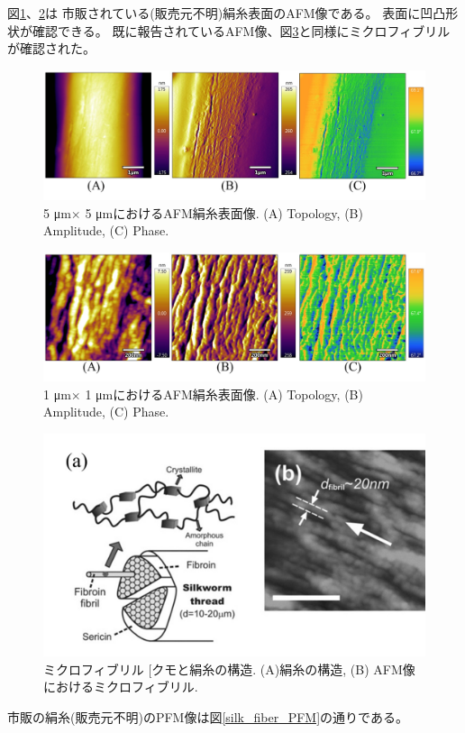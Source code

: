 \documentclass[dvipdfmx,12pt,a4paper]{jreport}
\makeatletter
\DeclareRobustCommand\cite{\unskip
    	\@ifnextchar[{\@tempswatrue\@citex}{\@tempswafalse\@citex[]}}
\makeatother
\begin{document}
		\newpage
		図\ref{5_5_AFM_silk}、\ref{1_1_AFM_silk}は
		市販されている(販売元不明)絹糸表面のAFM像である。
		表面に凹凸形状が確認できる。
		既に報告されているAFM像、図\ref{先行研究_AFM_糸}と同様にミクロフィブリルが確認された。
		\begin{figure}[h]
			\centering
			\includegraphics[width=\linewidth]{AFM_5_5.jpg}
			\caption{5 \si{\micro\meter}$\times$ 5 \si{\micro\meter}におけるAFM絹糸表面像. 
			(A) Topology, (B) Amplitude, (C) Phase. }
			\label{5_5_AFM_silk}
		\end{figure}
		\begin{figure}[h]
			\centering
			\includegraphics[width=\linewidth]{AFM_1_1.jpg}
			\caption{1 \si{\micro\meter}$\times$ 1 \si{\micro\meter}におけるAFM絹糸表面像. 
			(A) Topology, (B) Amplitude, (C) Phase.}
			\label{1_1_AFM_silk}
		\end{figure}
		\begin{figure}[H]
			\centering
			\includegraphics[scale=0.65]{AFM_silk.jpg}
			\caption{ミクロフィブリル\cite{クモと絹糸の構造}. (A)絹糸の構造, (B) AFM像におけるミクロフィブリル.}
			\label{先行研究_AFM_糸}
		\end{figure}
		\newpage
		市販の絹糸(販売元不明)のPFM像は図\ref{silk_fiber_PFM}の通りである。
\end{document}
